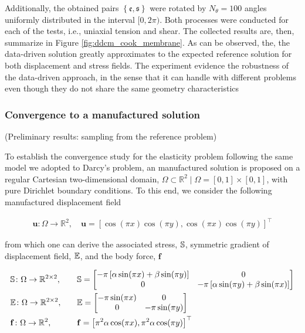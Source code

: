 Additionally, the obtained pairs $ \left\{\mathfrak{e},\mathfrak{s}\right\} $ were rotated by $ N_{\theta} = 100 $ angles uniformly distributed in the interval $ [0, 2\pi) $. Both processes were conducted for each of the tests, i.e., uniaxial tension and shear. The collected results are, then, summarize in Figure \ref{fig:ddcm_cook_membrane}. As can be observed, the, the data-driven solution greatly approximates to the expected reference solution for both displacement and stress fields. The experiment evidence the robustness of the data-driven approach, in the sense that it can handle with different problems even though they do not share the same geometry characteristics


\subsubsection{Convergence to a manufactured solution}

(Preliminary results: sampling from the reference problem)

To establish the convergence study for the elasticity problem following the same model we adopted to Darcy's problem, an manufactured solution is proposed on a regular Cartesian two-dimensional domain, $ \Omega \subset \mathbb{R}^{2} \mid \Omega = [0,1] \times [0,1] $, with pure Dirichlet boundary conditions. To this end, we consider the following manufactured displacement field

\begin{equation*}
	\begin{aligned}
		\mathbf{u}\colon \Omega \rightarrow \mathbb{R}^{2}, \quad \mathbf{u} = \left[\cos(\pi x)\cos(\pi y),\cos(\pi x)\cos(\pi y) \right]^{\top}	
	\end{aligned}
\end{equation*}

from which one can derive the associated stress, $ \mathbb{S} $, symmetric gradient of displacement field, $ \mathbb{E} $, and the body force, $ \mathbf{f} $

\begin{equation*}
	\begin{aligned}
		&\mathbb{S} \colon \Omega \rightarrow \mathbb{R}^{2\times2}, \quad &&\mathbb{S} = \begin{bmatrix}
			-\pi\left[\alpha\sin(\pi x) + \beta\sin(\pi y)\right] & 0 \\
			0 &-\pi\left[\alpha\sin(\pi y) + \beta\sin(\pi x)\right]
		\end{bmatrix}
		 \\
	 	&\mathbb{E} \colon \Omega \rightarrow \mathbb{R}^{2\times2}, \quad &&\mathbb{E} = \begin{bmatrix}
	 		-\pi \sin(\pi x) & 0 \\
	 		0 &-\pi \sin(\pi y)
	 	\end{bmatrix}
 		\\
 		&\mathbf{f} \colon \Omega \rightarrow \mathbb{R}^{2}, \quad &&\mathbf{f} = \left[\pi^2\alpha\cos(\pi x), \pi^2\alpha\cos(\pi y) \right]^{\top}
	\end{aligned}
\end{equation*}


